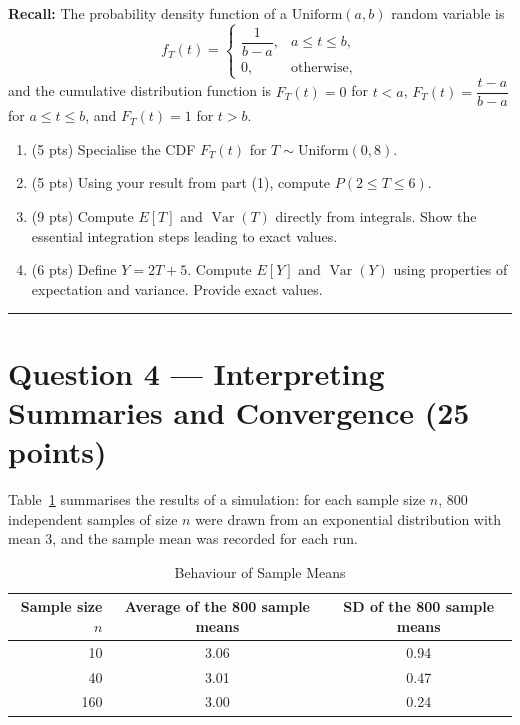 \documentclass[11pt]{article}
\begin{document}
\medskip
\noindent\textbf{Recall:} The probability density function of a $\mathrm{Uniform}(a,b)$ random variable is
\[
f_T(t) =
\begin{cases}
\dfrac{1}{b-a}, & a \le t \le b,\\
0, & \text{otherwise},
\end{cases}
\]
and the cumulative distribution function is $F_T(t) = 0$ for $t<a$, $F_T(t) = \dfrac{t-a}{b-a}$ for $a \le t \le b$, and $F_T(t) = 1$ for $t>b$.

\begin{enumerate}
  \item (5 pts) Specialise the CDF $F_T(t)$ for $T \sim \mathrm{Uniform}(0,8)$.
  \item (5 pts) Using your result from part (1), compute $P(2 \le T \le 6)$.
  \item (9 pts) Compute $E[T]$ and $\operatorname{Var}(T)$ directly from integrals. Show the essential integration steps leading to exact values.
  \item (6 pts) Define $Y = 2T + 5$. Compute $E[Y]$ and $\operatorname{Var}(Y)$ using properties of expectation and variance. Provide exact values.
\end{enumerate}

\vspace{0.75em}
\hrule
\vspace{0.75em}

\section*{Question 4 — Interpreting Summaries and Convergence (25 points)}

Table~\ref{tab:b-sim-sol} summarises the results of a simulation: for each sample size $n$, 800 independent samples of size $n$ were drawn from an exponential distribution with mean $3$, and the sample mean was recorded for each run.

\begin{table}[h]
\centering
\caption{Behaviour of Sample Means}\label{tab:b-sim-sol}
\begin{tabular}{@{}rcc@{}}
\toprule
\textbf{Sample size $n$} & \textbf{Average of the 800 sample means} & \textbf{SD of the 800 sample means}\\
\midrule
10  & 3.06 & 0.94 \\
40  & 3.01 & 0.47 \\
160 & 3.00 & 0.24 \\
\bottomrule
\end{tabular}
\end{table}
\end{document}
